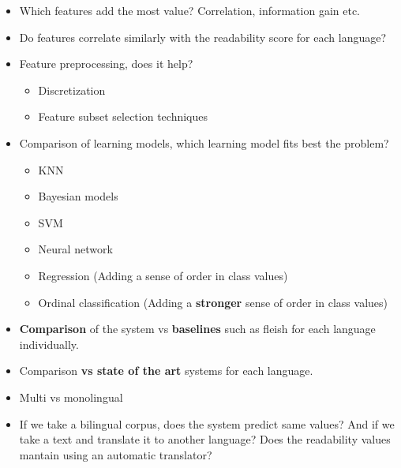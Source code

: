 \documentclass[12pt]{article}
\begin{document}
\begin{itemize}

\item Which features add the most value? Correlation, information gain etc.

\item Do features correlate similarly with the readability score for each language?

\item Feature preprocessing, does it help?
	\begin{itemize}
	\item Discretization
	\item Feature subset selection techniques
	\end{itemize}
	
\item Comparison of learning models, which learning model fits best the problem?
	\begin{itemize}
	\item KNN
	\item Bayesian models
	\item SVM
	\item Neural network
	\item Regression (Adding a sense of order in class values)
	\item Ordinal classification (Adding a \textbf{stronger} sense of order in class values)
	\end{itemize}

\item \textbf{Comparison} of the system vs \textbf{baselines} such as fleish for each language individually.

\item Comparison \textbf{vs state of the art} systems for each language.

\item Multi vs monolingual
\item If we take a bilingual corpus, does the system predict same values? And if we take a text and translate it to another language? Does the readability values mantain using an automatic translator?
\end{itemize}
\end{document}
